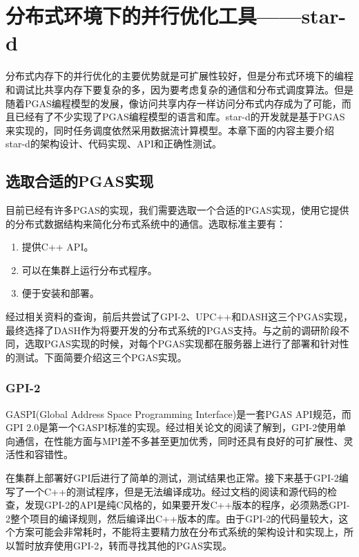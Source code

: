 
\chapter{分布式环境下的并行优化工具——star-d}
\label{chap:stard4}

分布式内存下的并行优化的主要优势就是可扩展性较好，但是分布式环境下的编程和调试比共享内存下要复杂的多，因为要考虑复杂的通信和分布式调度算法。但是随着PGAS编程模型的发展，像访问共享内存一样访问分布式内存成为了可能，而且已经有了不少实现了PGAS编程模型的语言和库。star-d的开发就是基于PGAS来实现的，同时任务调度依然采用数据流计算模型。本章下面的内容主要介绍star-d的架构设计、代码实现、API和正确性测试。

\section{选取合适的PGAS实现}

目前已经有许多PGAS的实现，我们需要选取一个合适的PGAS实现，使用它提供的分布式数据结构来简化分布式系统中的通信。选取标准主要有：

\begin{enumerate}
	\item 提供C++ API。
	\item 可以在集群上运行分布式程序。
	\item 便于安装和部署。
\end{enumerate}

经过相关资料的查询，前后共尝试了GPI-2\citep{grunewald2013gaspi}、UPC++\citep{zheng2014upc++}和DASH\citep{furlinger2016dash}这三个PGAS实现，最终选择了DASH作为将要开发的分布式系统的PGAS支持。与之前的调研阶段不同，选取PGAS实现的时候，对每个PGAS实现都在服务器上进行了部署和针对性的测试。下面简要介绍这三个PGAS实现。

\subsection{GPI-2}

GASPI(Global Address Space Programming Interface)\citep{grunewald2013gaspi}是一套PGAS API规范，而GPI 2.0是第一个GASPI标准的实现。经过相关论文的阅读了解到，GPI-2使用单向通信，在性能方面与MPI差不多甚至更加优秀，同时还具有良好的可扩展性、灵活性和容错性。

在集群上部署好GPI后进行了简单的测试，测试结果也正常。接下来基于GPI-2编写了一个C++的测试程序，但是无法编译成功。经过文档的阅读和源代码的检查，发现GPI-2的API是纯C风格的，如果要开发C++版本的程序，必须熟悉GPI-2整个项目的编译规则，然后编译出C++版本的库。由于GPI-2的代码量较大，这个方案可能会非常耗时，不能将主要精力放在分布式系统的架构设计和实现上，所以暂时放弃使用GPI-2，转而寻找其他的PGAS实现。


